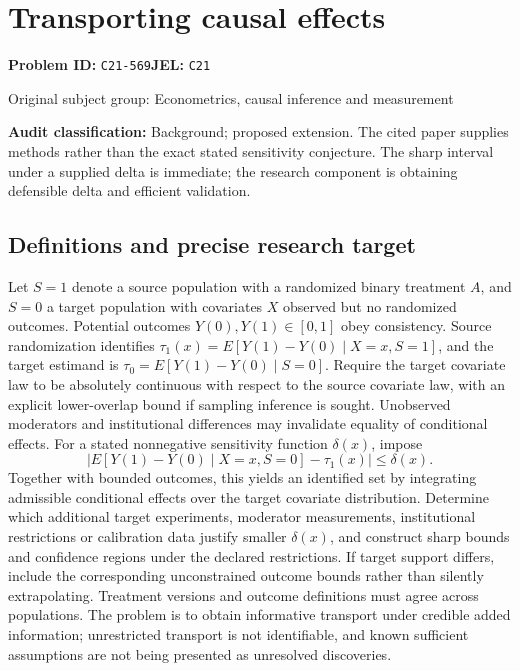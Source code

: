 \documentclass[11pt,a4paper]{article}
\begin{document}
\section*{Transporting causal effects}
\textbf{Problem ID:} \texttt{C21-569}\quad \textbf{JEL:} \texttt{C21}\par
\label{problem:OP-0420}
{\sffamily\small\color{muted}Original subject group: Econometrics, causal inference and measurement\par}
\label{definitions:problem:30007702}
\textbf{Audit classification:} Background; proposed extension. The cited paper supplies methods rather than the exact stated sensitivity conjecture. The sharp interval under a supplied delta is immediate; the research component is obtaining defensible delta and efficient validation.
\subsection*{Definitions and precise research target}
Let \(S=1\) denote a source population with a randomized binary treatment \(A\), and \(S=0\) a target population with covariates \(X\) observed but no randomized outcomes. Potential outcomes \(Y(0),Y(1)\in[0,1]\) obey consistency. Source randomization identifies \(\tau_1(x)=E[Y(1)-Y(0)\mid X=x,S=1]\), and the target estimand is \(\tau_0=E[Y(1)-Y(0)\mid S=0]\). Require the target covariate law to be absolutely continuous with respect to the source covariate law, with an explicit lower-overlap bound if sampling inference is sought. Unobserved moderators and institutional differences may invalidate equality of conditional effects. For a stated nonnegative sensitivity function \(\delta(x)\), impose
\[
|E[Y(1)-Y(0)\mid X=x,S=0]-\tau_1(x)|\leq\delta(x).
\]
Together with bounded outcomes, this yields an identified set by integrating admissible conditional effects over the target covariate distribution. Determine which additional target experiments, moderator measurements, institutional restrictions or calibration data justify smaller \(\delta(x)\), and construct sharp bounds and confidence regions under the declared restrictions. If target support differs, include the corresponding unconstrained outcome bounds rather than silently extrapolating. Treatment versions and outcome definitions must agree across populations. The problem is to obtain informative transport under credible added information; unrestricted transport is not identifiable, and known sufficient assumptions are not being presented as unresolved discoveries.
\end{document}

